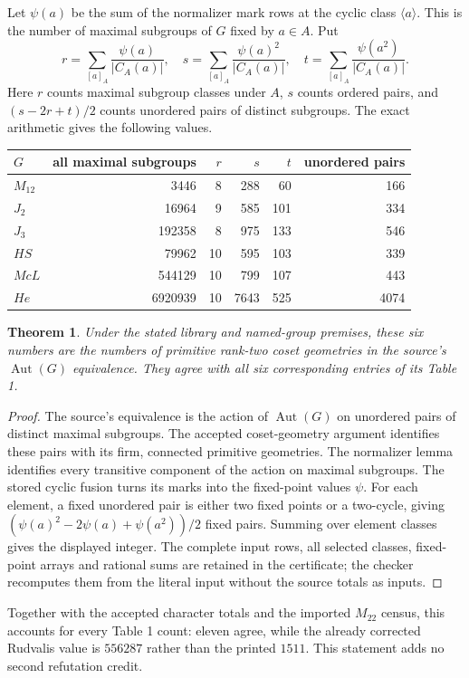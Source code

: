 \documentclass[11pt]{article}
\newtheorem{theorem}{Theorem}
\newcommand{\Aut}{\operatorname{Aut}}
\begin{document}
Let $\psi(a)$ be the sum of the normalizer mark rows at the cyclic class
$\langle a\rangle$. This is the number of maximal subgroups of $G$ fixed
by $a\in A$. Put
\[
 r=\sum_{[a]_A}\frac{\psi(a)}{|C_A(a)|},\quad
 s=\sum_{[a]_A}\frac{\psi(a)^2}{|C_A(a)|},\quad
 t=\sum_{[a]_A}\frac{\psi(a^2)}{|C_A(a)|}.
\]
Here $r$ counts maximal subgroup classes under $A$, $s$ counts ordered
pairs, and $(s-2r+t)/2$ counts unordered pairs of distinct subgroups.
The exact arithmetic gives the following values.
\begin{center}\small
\begin{tabular}{lrrrrr}
\toprule
$G$ & all maximal subgroups & $r$ & $s$ & $t$ & unordered pairs\\
\midrule
$M_{12}$ & 3446 & 8 & 288 & 60 & 166\\
$J_2$ & 16964 & 9 & 585 & 101 & 334\\
$J_3$ & 192358 & 8 & 975 & 133 & 546\\
$HS$ & 79962 & 10 & 595 & 103 & 339\\
$McL$ & 544129 & 10 & 799 & 107 & 443\\
$He$ & 6920939 & 10 & 7643 & 525 & 4074\\
\bottomrule
\end{tabular}
\end{center}
\begin{theorem}
Under the stated library and named-group premises, these six numbers are
the numbers of primitive rank-two coset geometries in the source's
$\Aut(G)$ equivalence. They agree with all six corresponding entries
of its Table 1.
\end{theorem}
\begin{proof}
The source's equivalence is the action of $\Aut(G)$ on unordered pairs of
distinct maximal subgroups. The accepted coset-geometry argument identifies
these pairs with its firm, connected primitive geometries. The normalizer
lemma identifies every transitive component of the action on maximal
subgroups. The stored cyclic fusion turns its marks into the fixed-point
values $\psi$. For each element, a fixed unordered pair is either two fixed
points or a two-cycle, giving
$(\psi(a)^2-2\psi(a)+\psi(a^2))/2$ fixed pairs. Summing over element
classes gives the displayed integer. The complete input rows, all selected
classes, fixed-point arrays and rational sums are retained in the certificate;
the checker recomputes them from the literal input without the source totals
as inputs.
\end{proof}
Together with the accepted character totals and the imported $M_{22}$ census,
this accounts for every Table 1 count: eleven agree, while the already
corrected Rudvalis value is $556287$ rather than the printed $1511$.
This statement adds no second refutation credit.
\end{document}
